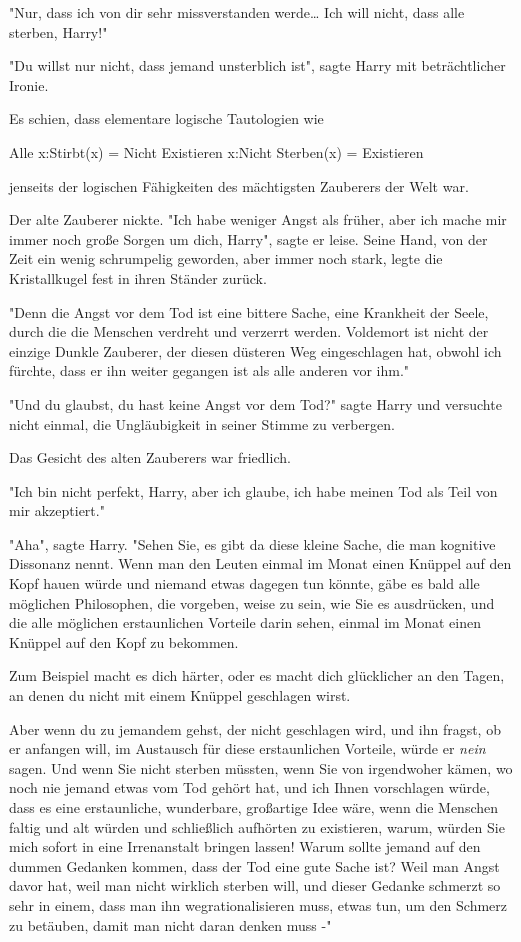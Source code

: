 {"Nur, dass ich von dir sehr missverstanden werde… Ich will nicht, dass alle sterben, Harry!"

"Du willst nur nicht, dass jemand unsterblich ist", sagte Harry mit beträchtlicher Ironie.

Es schien, dass elementare logische Tautologien wie

Alle x:Stirbt(x) = Nicht Existieren x:Nicht Sterben(x) = Existieren

jenseits der logischen Fähigkeiten des mächtigsten Zauberers der Welt war.

Der alte Zauberer nickte. "Ich habe weniger Angst als früher, aber ich mache mir immer noch große Sorgen um dich, Harry", sagte er leise. Seine Hand, von der Zeit ein wenig schrumpelig geworden, aber immer noch stark, legte die Kristallkugel fest in ihren Ständer zurück.

"Denn die Angst vor dem Tod ist eine bittere Sache, eine Krankheit der Seele, durch die die Menschen verdreht und verzerrt werden. Voldemort ist nicht der einzige Dunkle Zauberer, der diesen düsteren Weg eingeschlagen hat, obwohl ich fürchte, dass er ihn weiter gegangen ist als alle anderen vor ihm."

"Und du glaubst, du hast keine Angst vor dem Tod?" sagte Harry und versuchte nicht einmal, die Ungläubigkeit in seiner Stimme zu verbergen.

Das Gesicht des alten Zauberers war friedlich.

"Ich bin nicht perfekt, Harry, aber ich glaube, ich habe meinen Tod als Teil von mir akzeptiert."

"Aha", sagte Harry. "Sehen Sie, es gibt da diese kleine Sache, die man kognitive Dissonanz nennt. Wenn man den Leuten einmal im Monat einen Knüppel auf den Kopf hauen würde und niemand etwas dagegen tun könnte, gäbe es bald alle möglichen Philosophen, die vorgeben, weise zu sein, wie Sie es ausdrücken, und die alle möglichen erstaunlichen Vorteile darin sehen, einmal im Monat einen Knüppel auf den Kopf zu bekommen.

Zum Beispiel macht es dich härter, oder es macht dich glücklicher an den Tagen, an denen du nicht mit einem Knüppel geschlagen wirst.

Aber wenn du zu jemandem gehst, der nicht geschlagen wird, und ihn fragst, ob er anfangen will, im Austausch für diese erstaunlichen Vorteile, würde er \emph{nein} sagen. Und wenn Sie nicht sterben müssten, wenn Sie von irgendwoher kämen, wo noch nie jemand etwas vom Tod gehört hat, und ich Ihnen vorschlagen würde, dass es eine erstaunliche, wunderbare, großartige Idee wäre, wenn die Menschen faltig und alt würden und schließlich aufhörten zu existieren, warum, würden Sie mich sofort in eine Irrenanstalt bringen lassen! Warum sollte jemand auf den dummen Gedanken kommen, dass der Tod eine gute Sache ist? Weil man Angst davor hat, weil man nicht wirklich sterben will, und dieser Gedanke schmerzt so sehr in einem, dass man ihn wegrationalisieren muss, etwas tun, um den Schmerz zu betäuben, damit man nicht daran denken muss -"

}
